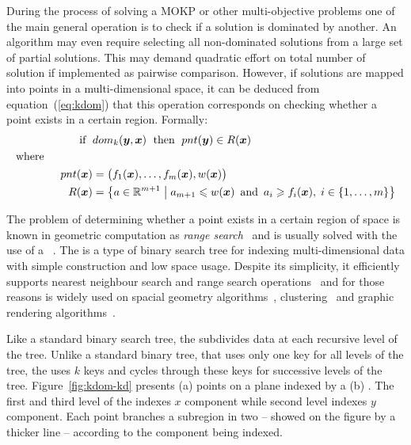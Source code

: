 During the process of solving a MOKP or other multi-objective problems
one of the main general operation is to check if a solution is dominated
by another.
An algorithm may even require selecting all non-dominated solutions
from a large set of partial solutions.
This may demand quadratic effort on total number of solution if implemented
as pairwise comparison.
However, if solutions are mapped into points in a multi-dimensional space,
it can be deduced from equation~(\ref{eq:kdom}) that
this operation corresponds on checking whether a point exists in a certain region.
Formally:
\begin{align*}
    \text{ if } \; &dom_k(\boldsymbol{y}, \boldsymbol{x}) \; \text{ then } \; pnt(\boldsymbol{y}) \in R(\boldsymbol{x}) \\
  \text{where} \phantom{mmmmm} \\
    pnt(\boldsymbol{x}) &= \big(f_{1}(\boldsymbol{x}), \ldots, f_{m}(\boldsymbol{x}), w(\boldsymbol{x})\big) \\
    R(\boldsymbol{x}) &= \left\{ a \in \mathbb{R}^{m+1} \;\middle|\;
      a_{m+1} \leqslant w(\boldsymbol{x})
      \, \text{ and } \,
      a_i \geqslant f_{i}(\boldsymbol{x}), \; i \in \{1, \ldots, m\}
      \right\}
\end{align*}

The problem of determining whether a point exists in a certain region
of space is known in geometric computation as
\emph{range search}~\cite{agarwal1999geometric}
and is usually solved with the use of a
\kdtree{}~\cite{preparata2012computational}.
The \kdtree{} is a type of binary search tree for indexing multi-dimensional
data with simple construction and low space usage.
Despite its simplicity, it efficiently supports nearest
neighbour search and range search operations~\cite{bentley1975} and
for those reasons \kdtree{} is widely used on
spacial geometry algorithms~\cite{preparata2012computational, guttman1984r},
clustering~\cite{kanungo2002efficient, indyk1998approximate}
and graphic rendering algorithms~\cite{owens2007survey}.

Like a standard binary search tree, the \kdtree{} subdivides data at each
recursive level of the tree.
Unlike a standard binary tree, that uses only one key for all levels of the tree,
the \kdtree{} uses $k$ keys and cycles through these keys for successive levels
of the tree.
Figure~\ref{fig:kdom-kd} presents
(a) points on a plane
indexed by a (b) .
The first and third level of the  indexes $x$ component
while second level indexes $y$ component.
Each point branches a subregion in two -- showed on the figure by a
thicker line -- according to the component being indexed.


